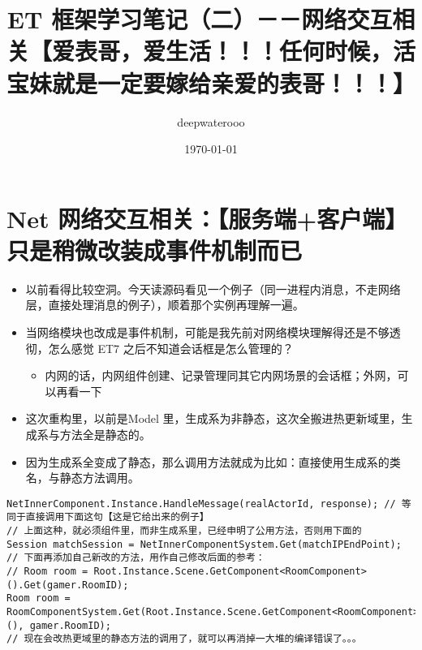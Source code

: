 \documentclass[9pt, b5paper]{article}
\author{deepwaterooo}
\date{\today}
\title{ET 框架学习笔记（二）－－网络交互相关【爱表哥，爱生活！！！任何时候，活宝妹就是一定要嫁给亲爱的表哥！！！】}
\begin{document}
\maketitle
\tableofcontents


\section{Net 网络交互相关：【服务端+客户端】只是稍微改装成事件机制而已}
\label{sec-1}
\begin{itemize}
\item 以前看得比较空洞。今天读源码看见一个例子（同一进程内消息，不走网络层，直接处理消息的例子），顺着那个实例再理解一遍。
\item 当网络模块也改成是事件机制，可能是我先前对网络模块理解得还是不够透彻，怎么感觉 ET7 之后不知道会话框是怎么管理的？
\begin{itemize}
\item 内网的话，内网组件创建、记录管理同其它内网场景的会话框；外网，可以再看一下
\end{itemize}
\item 这次重构里，以前是Model 里，生成系为非静态，这次全搬进热更新域里，生成系与方法全是静态的。
\item 因为生成系全变成了静态，那么调用方法就成为比如：直接使用生成系的类名，与静态方法调用。
\end{itemize}
\begin{verbatim}
NetInnerComponent.Instance.HandleMessage(realActorId, response); // 等同于直接调用下面这句【这是它给出来的例子】
// 上面这种，就必须组件里，而非生成系里，已经申明了公用方法，否则用下面的
Session matchSession = NetInnerComponentSystem.Get(matchIPEndPoint);
// 下面再添加自己新改的方法，用作自己修改后面的参考：
// Room room = Root.Instance.Scene.GetComponent<RoomComponent>().Get(gamer.RoomID);
Room room = RoomComponentSystem.Get(Root.Instance.Scene.GetComponent<RoomComponent>(), gamer.RoomID);
// 现在会改热更域里的静态方法的调用了，就可以再消掉一大堆的编译错误了。。。
\end{verbatim}
\end{document}

